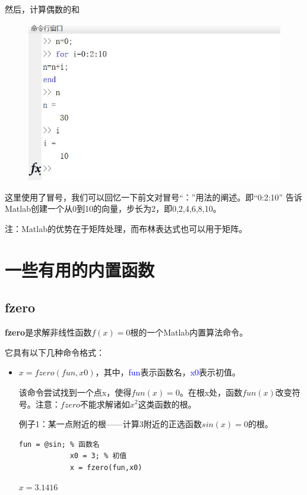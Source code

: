 \documentclass[cn,10pt,math=newtx,citestyle=gb7714-2015,bibstyle=gb7714-2015]{elegantbook}
\begin{document}
{{	然后，计算偶数的和
	
	\begin{figure}[htbp!]
		\centering
		\includegraphics[width=0.8\linewidth]{FIG/vectorevensum}
		\centering
	\end{figure}
	
	这里使用了冒号，我们可以回忆一下前文对冒号“：”用法的阐述。即“0:2:10” 告诉Matlab创建一个从0到10的向量，步长为2，即0,2,4,6,8,10。
	
	注：Matlab的优势在于矩阵处理，而布林表达式也可以用于矩阵。
	
	\section{一些有用的内置函数}
	
	\subsection{fzero}
	
	\textbf{fzero}是求解非线性函数$f(x)=0$根的一个Matlab内置算法命令。
	
	它具有以下几种命令格式：
	\begin{itemize}
		\item $x=fzero(fun,x0)$，其中，\textcolor{blue}{fun}表示函数名，\textcolor{blue}{x0}表示初值。
		
		该命令尝试找到一个点x，使得$fun(x)=0$。在根x处，函数$fun(x)$改变符号。注意：$fzero$不能求解诸如$x^2$这类函数的根。
		
		例子1：某一点附近的根——计算3附近的正选函数$sin(x)=0$的根。
		
		\begin{lstlisting}[frame=shadowbox]
			fun = @sin; % 函数名
			x0 = 3; % 初值
			x = fzero(fun,x0)
		\end{lstlisting}
		
		$x=3.1416$
		

\end{itemize}}}
\end{document}

